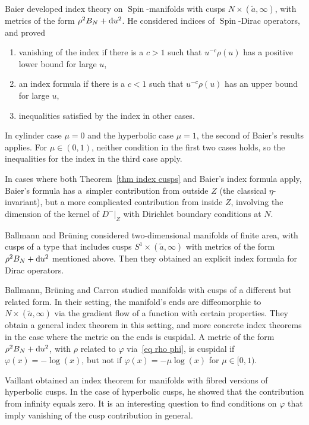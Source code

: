 \documentclass[10pt,a4paper]{amsart}
\numberwithin{equation}{section}
\DeclareMathOperator{\Spin}{Spin}
\begin{document}
Baier \cite{Baier02} developed
index theory on $\Spin$-manifolds with cusps $N\times (\tilde a, \infty)$, with metrics of the form $\rho^2 B_N + {\rm d}u^2$.
He considered indices of $\Spin$-Dirac operators, and proved
\begin{enumerate}\itemsep=0pt
\item[(1)] vanishing of the index if there is a $c>1$ such that $u^{-c} \rho(u)$ has a positive lower bound for large $u$,
\item[(2)] an index formula if there is a $c<1$ such that $u^{-c} \rho(u)$ has an upper bound for large $u$,
\item[(3)] inequalities satisfied by the index in other cases.
\end{enumerate}

 In cylinder case $\mu = 0$ and the hyperbolic case $\mu = 1$, the second of Baier's results applies. For $\mu \in (0,1)$, neither condition in the first two cases holds, so the inequalities for the index in the third case apply.

In cases where both Theorem~\ref{thm index cusps} and Baier's index formula apply, Baier's formula has a~simpler contribution from outside $Z$ (the classical $\eta$-invariant), but a more complicated contribution from inside $Z$, involving the dimension of the kernel of $D^-|_Z$ with Dirichlet boundary conditions at $N$.

Ballmann and
Br\"uning \cite{BB03} considered two-dimensional manifolds of finite area, with cusps of a type that includes
 cusps $S^1 \times (\tilde a, \infty)$ with metrics of the form $\rho^2 B_N + {\rm d}u^2$ mentioned above. Then they obtained an explicit index formula for Dirac operators.

 Ballmann,
Br\"uning and Carron \cite{BBC12} studied manifolds with cusps of a different but related form. In their setting, the manifold's ends are diffeomorphic to $N \times (\tilde a, \infty)$ via the gradient flow of a function with certain properties. They obtain a general index theorem in this setting, and more concrete index theorems in the case where the metric on the ends is cuspidal. A metric of the form $\rho^2 B_N + {\rm d}u^2$, with $\rho$ related to $\varphi$ via~\eqref{eq rho phi}, is cuspidal if $\varphi(x) =-\log(x)$, but not if $\varphi(x) =-\mu \log(x)$ for $\mu \in [0,1)$.

Vaillant \cite{Vaillant01} obtained an index theorem for manifolds with fibred versions of hyperbolic cusps. In the case of hyperbolic cusps, he showed that the contribution from infinity equals zero. It is an interesting question to find conditions on $\varphi$ that imply vanishing of the cusp contribution in general.
\end{document}
